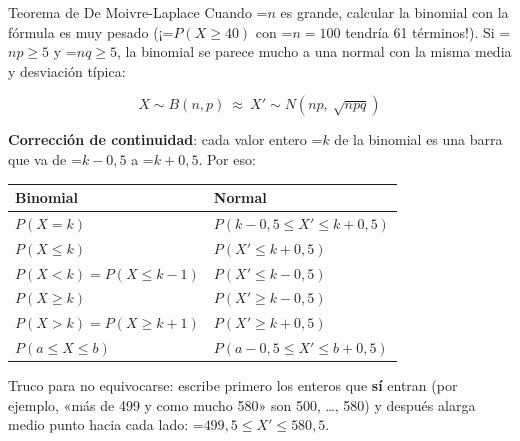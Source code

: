 \documentclass[11pt,a4paper]{article}
\newcommand{\lt}{<}\newcommand{\gt}{>}
\newcommand{\fmm}[1]{\setbox0=\hbox{$#1$}\ifdim\wd0>\linewidth\[#1\]\else\mbox{\box0}\fi}
\begin{document}
  

  
\begin{fmprop}{Teorema de De Moivre-Laplace}
Cuando \fmm{n} es grande, calcular la binomial con la fórmula es muy pesado (¡\fmm{P(X\geq40)} con \fmm{n=100} tendría 61 términos!). Si \fmm{np\geq5} y \fmm{nq\geq5}, la binomial se parece mucho a una normal con la misma media y desviación típica:

      
\[X\sim B(n,p)\ \approx\ X'\sim N\!\left(np,\ \sqrt{npq}\right)\]

      

\textbf{Corrección de continuidad}: cada valor entero \fmm{k} de la binomial es una barra que va de \fmm{k-0{,}5} a \fmm{k+0{,}5}. Por eso:

      
\begin{center}\renewcommand{\arraystretch}{1.7}\small\begin{tabularx}{\linewidth}{>{\raggedright\arraybackslash}p{5.2cm}>{\centering\arraybackslash}X}\toprule
\textbf{Binomial} & \textbf{Normal}\\\midrule
$P(X=k)$ & $P(k-0{,}5\leq X'\leq k+0{,}5)$\\[3pt]
$P(X\leq k)$ & $P(X'\leq k+0{,}5)$\\[3pt]
$P(X\lt k)=P(X\leq k-1)$ & $P(X'\leq k-0{,}5)$\\[3pt]
$P(X\geq k)$ & $P(X'\geq k-0{,}5)$\\[3pt]
$P(X\gt k)=P(X\geq k+1)$ & $P(X'\geq k+0{,}5)$\\[3pt]
$P(a\leq X\leq b)$ & $P(a-0{,}5\leq X'\leq b+0{,}5)$\\[3pt]
\bottomrule\end{tabularx}\end{center}

      
\begin{fmnote}Truco para no equivocarse: escribe primero los enteros que \textbf{sí} entran (por ejemplo, «más de 499 y como mucho 580» son 500, \dots{}, 580) y después alarga medio punto hacia cada lado: \fmm{499{,}5\leq X'\leq580{,}5}.\end{fmnote}
\end{fmprop}
\end{document}

